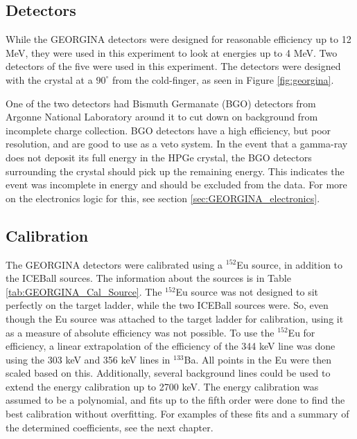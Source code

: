 \subsection{Detectors}

While the GEORGINA detectors were designed for reasonable efficiency up to 12 MeV, they were used in this experiment to look at energies up to 4 MeV. Two detectors of the five were used in this experiment. The detectors were designed with the crystal at a $90^{\circ}$ from the cold-finger, as seen in Figure \ref{fig:georgina}.





One of the two detectors had Bismuth Germanate (BGO) detectors from Argonne National Laboratory around it to cut down on background from incomplete charge collection. BGO detectors have a high efficiency, but poor resolution, and are good to use as a veto system. In the event that a gamma-ray does not deposit its full energy in the HPGe crystal, the BGO detectors surrounding the crystal should pick up the remaining energy. This indicates the event was incomplete in energy and should be excluded from the data. For more on the electronics logic for this, see section \ref{sec:GEORGINA_electronics}.

\subsection{Calibration}

The GEORGINA detectors were calibrated using a $^{152}$Eu source, in addition to the ICEBall sources. The information about the sources is in Table \ref{tab:GEORGINA_Cal_Source}. The $^{152}$Eu source was not designed to sit perfectly on the target ladder, while the two ICEBall sources were. So, even though the Eu source was attached to the target ladder for calibration, using it as a measure of absolute efficiency was not possible. To use the $^{152}$Eu for efficiency, a linear extrapolation of the efficiency of the 344 keV line was done using the 303 keV and 356 keV lines in $^{133}$Ba. All points in the Eu were then scaled based on this. Additionally, several background lines could be used to extend the energy calibration up to 2700 keV. The energy calibration was assumed to be a polynomial, and fits up to the fifth order were done to find the best calibration without overfitting. For examples of these fits and a summary of the determined coefficients, see the next chapter.

